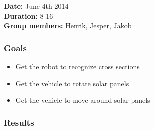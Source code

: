 \textbf{Date:} June 4th 2014\\\textbf{Duration:} 8-16\\\textbf{Group
members:} Henrik, Jesper, Jakob

\subsubsection{Goals}

\begin{itemize}
\itemsep1pt\parskip0pt
\item
  Get the robot to recognize cross sections
\item
  Get the vehicle to rotate solar panels
\item
  Get the vehicle to move around solar panels
\end{itemize}

\subsubsection{Results}

